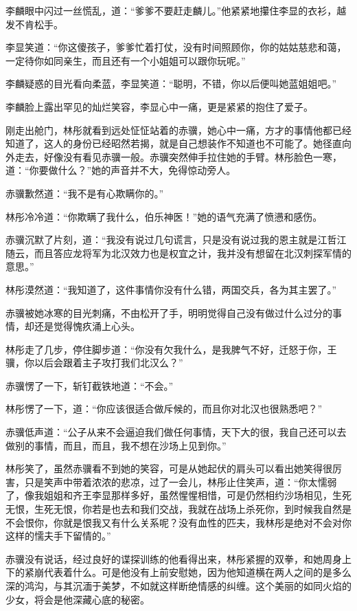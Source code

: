 李麟眼中闪过一丝慌乱，道：“爹爹不要赶走麟儿。”他紧紧地攥住李显的衣衫，越发不肯松手。

李显笑道：“你这傻孩子，爹爹忙着打仗，没有时间照顾你，你的姑姑慈悲和蔼，一定待你如同亲生，而且还有一个小姐姐可以跟你玩呢。”

李麟疑惑的目光看向柔蓝，李显笑道：“聪明，不错，你以后便叫她蓝姐姐吧。”

李麟脸上露出罕见的灿烂笑容，李显心中一痛，更是紧紧的抱住了爱子。

刚走出舱门，林彤就看到远处怔怔站着的赤骥，她心中一痛，方才的事情他都已经知道了，这人的身份已经昭然若揭，就是自己想装作不知道也不可能了。她径直向外走去，好像没有看见赤骥一般。赤骥突然伸手拉住她的手臂。林彤脸色一寒，道：“你要做什么？”她的声音并不大，免得惊动旁人。

赤骥歉然道：“我不是有心欺瞒你的。”

林彤冷冷道：“你欺瞒了我什么，伯乐神医！”她的语气充满了愤懑和感伤。

赤骥沉默了片刻，道：“我没有说过几句谎言，只是没有说过我的恩主就是江哲江随云，而且答应龙将军为北汉效力也是权宜之计，我并没有想留在北汉刺探军情的意思。”

林彤漠然道：“我知道了，这件事情你没有什么错，两国交兵，各为其主罢了。”

赤骥被她冰寒的目光刺痛，不由松开了手，明明觉得自己没有做过什么过分的事情，却还是觉得愧疚涌上心头。

林彤走了几步，停住脚步道：“你没有欠我什么，是我脾气不好，迁怒于你，王骥，你以后会跟着主子攻打我们北汉么？”

赤骥愣了一下，斩钉截铁地道：“不会。”

林彤愣了一下，道：“你应该很适合做斥候的，而且你对北汉也很熟悉吧？”

赤骥低声道：“公子从来不会逼迫我们做任何事情，天下大的很，我自己还可以去做别的事情，而且，而且，我不想在沙场上见到你。”

林彤笑了，虽然赤骥看不到她的笑容，可是从她起伏的肩头可以看出她笑得很厉害，只是笑声中带着浓浓的悲凉，过了一会儿，林彤止住笑声，道：“你太懦弱了，像我姐姐和齐王李显那样多好，虽然惺惺相惜，可是仍然相约沙场相见，生死无恨，生死无恨，你若是也去和我们交战，我就在战场上杀死你，到时候我自然是不会恨你，你就是恨我又有什么关系呢？没有血性的匹夫，我林彤是绝对不会对你这样的懦夫手下留情的。”

赤骥没有说话，经过良好的谍探训练的他看得出来，林彤紧握的双拳，和她周身上下的紧崩代表着什么。可是他没有上前安慰她，因为他知道横在两人之间的是多么深的鸿沟，与其沉湎于美梦，不如就这样断绝情感的纠缠。这个美丽的如同火焰的少女，将会是他深藏心底的秘密。

